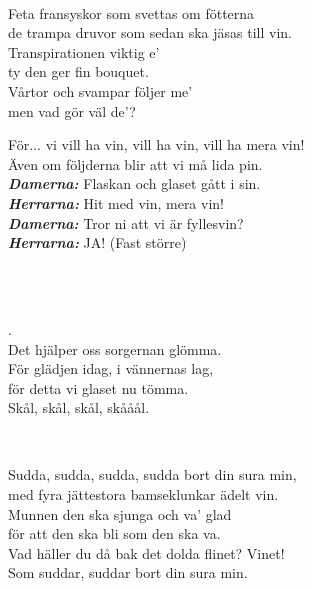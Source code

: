 

 \\       

\songtext{} 
Feta fransyskor som svettas om fötterna  \\ 
de trampa druvor som sedan ska jäsas till vin.  \\ 
Transpirationen viktig e' \\ 
ty den ger fin bouquet. \\ 
Vårtor och svampar följer me' \\ 
men vad gör väl de'? 

För... vi vill ha vin, vill ha vin, vill ha mera vin! \\ 
Även om följderna blir att vi må lida pin. \\ 
\textbf{\textit{Damerna:}} Flaskan och glaset gått i sin. \\ 
\textbf{\textit{Herrarna:}} Hit med vin, mera vin! \\ 
\textbf{\textit{Damerna:}} Tror ni att vi är fyllesvin? \\ 
\textbf{\textit{Herrarna:}} JA! (Fast större) 

 \\


 \\ 
\author{Text: Carl Sebardt}

\leftrepeat {}.\\
Det hjälper oss sorgernan glömma.\\
För glädjen idag, i vännernas lag,\\
för detta vi glaset nu tömma. \rightrepeat\\
Skål, skål, skål, skååål.\\

\newpage

 \\       

\songtext{} 
Sudda, sudda, sudda, sudda bort din sura min,\\   
med fyra jättestora bamseklunkar ädelt vin.\\   
Munnen den ska sjunga och va' glad\\   
för att den ska bli som den ska va.\\   
Vad häller du då bak det dolda flinet? Vinet!\\   
Som suddar, suddar bort din sura min.\\   



